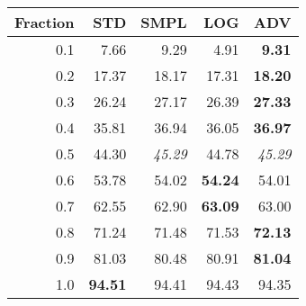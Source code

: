 \documentclass{standalone}
\begin{document}
\begin{tabular}{r|rrrr}
      \toprule
      Fraction & STD & SMPL & LOG & ADV\\
      \midrule
      0.1 & 7.66 & 9.29 & 4.91 & \textbf{9.31}\\
  0.2 & 17.37 & 18.17 & 17.31 & \textbf{18.20}\\
  0.3 & 26.24 & 27.17 & 26.39 & \textbf{27.33}\\
  0.4 & 35.81 & 36.94 & 36.05 & \textbf{36.97}\\
  0.5 & 44.30 & \emph{45.29} & 44.78 & \emph{45.29}\\
  0.6 & 53.78 & 54.02 & \textbf{54.24} & 54.01\\
  0.7 & 62.55 & 62.90 & \textbf{63.09} & 63.00\\
  0.8 & 71.24 & 71.48 & 71.53 & \textbf{72.13}\\
  0.9 & 81.03 & 80.48 & 80.91 & \textbf{81.04}\\
  1.0 & \textbf{94.51} & 94.41 & 94.43 & 94.35\\
  \bottomrule
\end{tabular}
\end{document}
